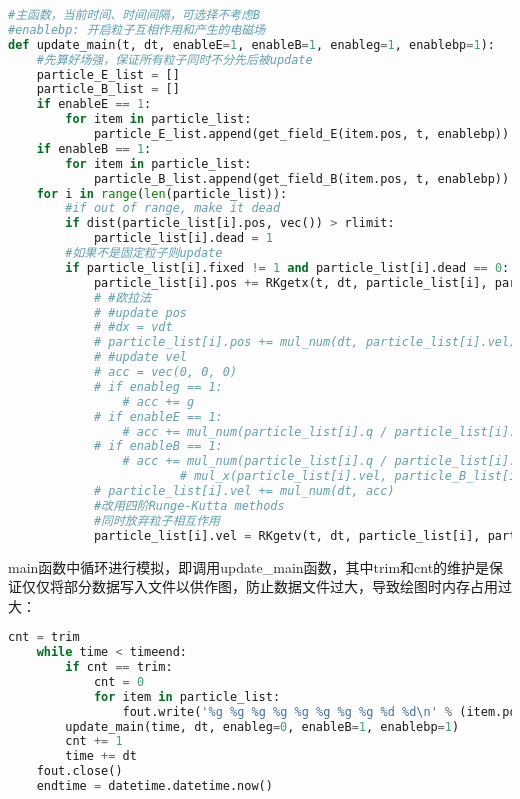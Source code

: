 \documentclass[UTF-8,cs4size]{ctexart}
\begin{document}
\begin{lstlisting}[language=Python]
#主函数，当前时间、时间间隔，可选择不考虑B
#enablebp: 开启粒子互相作用和产生的电磁场
def update_main(t, dt, enableE=1, enableB=1, enableg=1, enablebp=1):
    #先算好场强，保证所有粒子同时不分先后被update
    particle_E_list = []
    particle_B_list = []
    if enableE == 1:
        for item in particle_list:
            particle_E_list.append(get_field_E(item.pos, t, enablebp))
    if enableB == 1:
        for item in particle_list:
            particle_B_list.append(get_field_B(item.pos, t, enablebp))
    for i in range(len(particle_list)):
        #if out of range, make it dead 
        if dist(particle_list[i].pos, vec()) > rlimit:
            particle_list[i].dead = 1
        #如果不是固定粒子则update
        if particle_list[i].fixed != 1 and particle_list[i].dead == 0:
            particle_list[i].pos += RKgetx(t, dt, particle_list[i], particle_E_list[i], particle_B_list[i], enableg, enableE, enableB)
            # #欧拉法
            # #update pos
            # #dx = vdt
            # particle_list[i].pos += mul_num(dt, particle_list[i].vel)
            # #update vel
            # acc = vec(0, 0, 0)
            # if enableg == 1:
                # acc += g
            # if enableE == 1:
                # acc += mul_num(particle_list[i].q / particle_list[i].m, particle_E_list[i])
            # if enableB == 1:
                # acc += mul_num(particle_list[i].q / particle_list[i].m, \
                        # mul_x(particle_list[i].vel, particle_B_list[i]))
            # particle_list[i].vel += mul_num(dt, acc)
            #改用四阶Runge-Kutta methods
            #同时放弃粒子相互作用
            particle_list[i].vel = RKgetv(t, dt, particle_list[i], particle_E_list[i], particle_B_list[i], enableg=0, enableE=1, enableB=1)
\end{lstlisting}
main函数中循环进行模拟，即调用update\_main函数，其中trim和cnt的维护是保证仅仅将部分数据写入文件以供作图，防止数据文件过大，导致绘图时内存占用过大：
\begin{lstlisting}[language=Python]
    cnt = trim
    while time < timeend:
        if cnt == trim:
            cnt = 0
            for item in particle_list:
                fout.write('%g %g %g %g %g %g %g %g %d %d\n' % (item.pos.x, item.pos.y, item.pos.z, item.vel.x, item.vel.y, item.vel.z, item.q, item.m, item.fixed, item.dead))
        update_main(time, dt, enableg=0, enableB=1, enablebp=1)
        cnt += 1
        time += dt
    fout.close()
    endtime = datetime.datetime.now()
\end{lstlisting}
\end{document}
